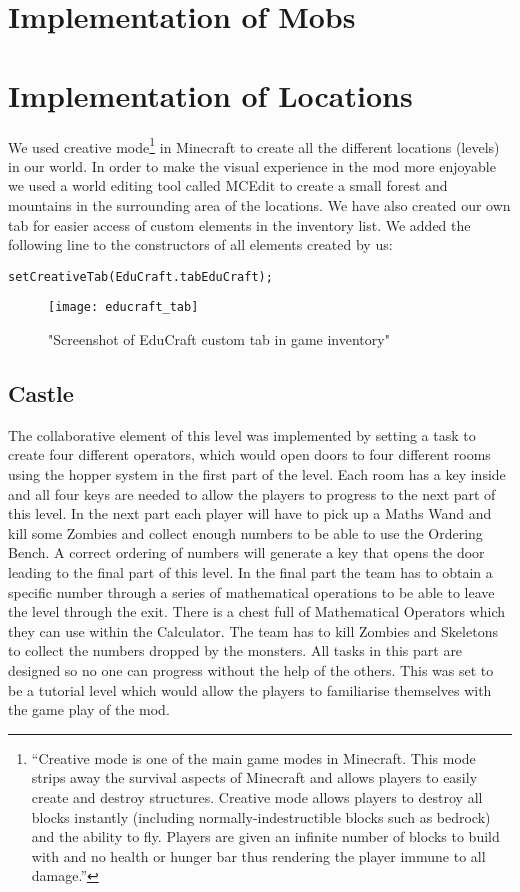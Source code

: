 \section{Implementation of Mobs}
\section{Implementation of Locations}
We used creative mode\footnote{``Creative mode is one of the main game modes in Minecraft. This mode strips away the survival aspects of Minecraft and allows players to easily create and destroy structures. Creative mode allows players to destroy all blocks instantly (including normally-indestructible blocks such as bedrock) and the ability to fly. Players are given an infinite number of blocks to build with and no health or hunger bar thus rendering the player immune to all damage.''\cite{website:minecraft-creative}} in Minecraft to create all the different locations (levels) in our world. In order to make the visual experience in the mod more enjoyable we used a world editing tool called MCEdit to create a small forest and mountains in the surrounding area of the locations.
We have also created our own tab for easier access of custom elements in the inventory list. We added the following line to the constructors of all elements created by us:
\begin{lstlisting}
setCreativeTab(EduCraft.tabEduCraft);
\end{lstlisting}
\begin{figure}[h!]
\centering
\texttt{[image: educraft\_tab]}
\caption{"Screenshot of EduCraft custom tab in game inventory"}
\end{figure}

\subsection{Castle}
The collaborative element of this level was implemented by setting a task to create four different operators, which would open doors to four different rooms using the hopper system in the first part of the level. Each room has a key inside and all four keys are needed to allow the players to progress to the next part of this level.\newline\newline
In the next part each player will have to pick up a Maths Wand and kill some Zombies and collect enough numbers to be able to use the Ordering Bench. A correct ordering of numbers will generate a key that opens the door leading to the final part of this level.\newline\newline
In the final part the team has to obtain a specific number through a series of mathematical operations to be able to leave the level through the exit. There is a chest full of Mathematical Operators which they can use within the Calculator. The team has to kill Zombies and Skeletons to collect the numbers dropped by the monsters.\newline\newline
All tasks in this part are designed so no one can progress without the help of the others. This was set to be a tutorial level which would allow the players to familiarise themselves with the game play of the mod.
